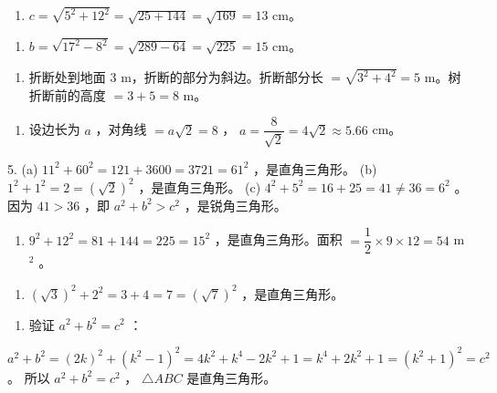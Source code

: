 \begin{answer}


\begin{enumerate}
  \item $c = \sqrt{5^2 + 12^2} = \sqrt{25 + 144} = \sqrt{169} = 13$ cm。
\end{enumerate}


\begin{enumerate}
  \item $b = \sqrt{17^2 - 8^2} = \sqrt{289 - 64} = \sqrt{225} = 15$ cm。
\end{enumerate}


\begin{enumerate}
  \item 折断处到地面 $3$ m，折断的部分为斜边。折断部分长 $= \sqrt{3^2 + 4^2} = 5$ m。树折断前的高度 $= 3 + 5 = 8$ m。
\end{enumerate}


\begin{enumerate}
  \item 设边长为 $a$ ，对角线 $= a\sqrt{2} = 8$ ， $a = \dfrac{8}{\sqrt{2}} = 4\sqrt{2} \approx 5.66$ cm。
\end{enumerate}


5.
   (a) $11^2 + 60^2 = 121 + 3600 = 3721 = 61^2$ ，是直角三角形。
   (b) $1^2 + 1^2 = 2 = (\sqrt{2})^2$ ，是直角三角形。
   (c) $4^2 + 5^2 = 16 + 25 = 41 \neq 36 = 6^2$ 。因为 $41 > 36$ ，即 $a^2 + b^2 > c^2$ ，是锐角三角形。

\begin{enumerate}
  \item $9^2 + 12^2 = 81 + 144 = 225 = 15^2$ ，是直角三角形。面积 $= \dfrac{1}{2} \times 9 \times 12 = 54$ m $^2$ 。
\end{enumerate}


\begin{enumerate}
  \item $(\sqrt{3})^2 + 2^2 = 3 + 4 = 7 = (\sqrt{7})^2$ ，是直角三角形。
\end{enumerate}


\begin{enumerate}
  \item 验证 $a^2 + b^2 = c^2$ ：
\end{enumerate}

   $a^2 + b^2 = (2k)^2 + (k^2 - 1)^2 = 4k^2 + k^4 - 2k^2 + 1 = k^4 + 2k^2 + 1 = (k^2 + 1)^2 = c^2$ 。
   所以 $a^2 + b^2 = c^2$ ， $\triangle ABC$ 是直角三角形。

\end{answer}
